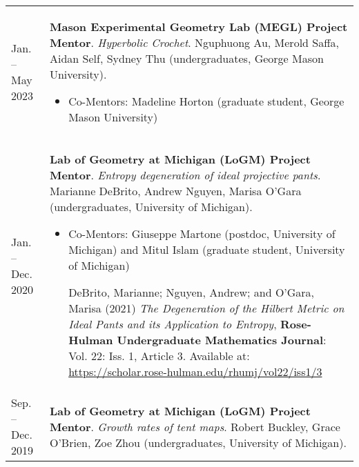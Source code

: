     \begin{center}
    {
    \renewcommand{\arraystretch}{1.5}
    \begin{longtable}{p{}  p{}}
     Jan.  --  May  2023 & \textbf{Mason Experimental Geometry Lab (MEGL) Project Mentor}. \textit{Hyperbolic Crochet}.  Nguphuong Au, Merold Saffa, Aidan Self, Sydney Thu (undergraduates, George Mason University). 
        \hspace{-1em}

        {\small
        \begin{itemize}
        \setlength{\parindent}{0em}
        \item[] 
            Co-Mentors: Madeline Horton (graduate student, George Mason University) 

            
            
        \end{itemize}
        }
        \vspace{-1em}
         \\ 
 Jan.  --  Dec.  2020 & \textbf{Lab of Geometry at Michigan (LoGM) Project Mentor}. \textit{Entropy degeneration of ideal projective pants}.  Marianne DeBrito, Andrew Nguyen, Marisa O'Gara (undergraduates, University of Michigan). 
        \hspace{-1em}

        {\small
        \begin{itemize}
        \setlength{\parindent}{0em}
        \item[] 
            Co-Mentors: Giuseppe Martone (postdoc, University of Michigan) and Mitul Islam (graduate student, University of Michigan) 

            DeBrito, Marianne; Nguyen, Andrew; and O'Gara, Marisa (2021) {\it The Degeneration of the Hilbert Metric on Ideal Pants and its Application to Entropy}, {\bf Rose-Hulman Undergraduate Mathematics Journal}: Vol. 22: Iss. 1, Article 3.
Available at: \url{https://scholar.rose-hulman.edu/rhumj/vol22/iss1/3}
            
        \end{itemize}
        }
        \vspace{-1em}
         \\ 
 Sep.  --  Dec.  2019 & \textbf{Lab of Geometry at Michigan (LoGM) Project Mentor}. \textit{Growth rates of tent maps}.  Robert Buckley, Grace O'Brien, Zoe Zhou (undergraduates, University of Michigan). 
        \hspace{-1em}


\end{longtable}}
\end{center}
